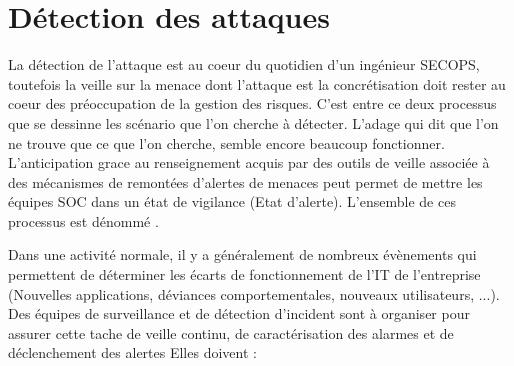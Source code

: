 \section{Détection des attaques}

La détection de l'attaque est au coeur du quotidien d'un ingénieur SECOPS, toutefois la veille sur la menace dont l'attaque est la concrétisation doit rester au coeur des préoccupation de la gestion des risques. C'est entre ce deux processus que se dessinne les scénario que l'on cherche à détecter. L'adage qui dit que l'on ne trouve que ce que l'on cherche, semble encore beaucoup fonctionner.  L'anticipation grace au renseignement acquis par des outils de veille associée à des mécanismes de remontées d'alertes de menaces peut permet de mettre les équipes SOC dans un état de vigilance (Etat d'alerte). L'ensemble de ces processus  est dénommé .

Dans une activité normale, il y a généralement de nombreux évènements qui permettent de déterminer les écarts  de fonctionnement de l'IT de l'entreprise (Nouvelles applications, déviances comportementales, nouveaux utilisateurs, ...). Des équipes de surveillance et de détection d'incident sont à organiser pour assurer cette tache de veille continu, de caractérisation des alarmes et de déclenchement des alertes Elles doivent :

